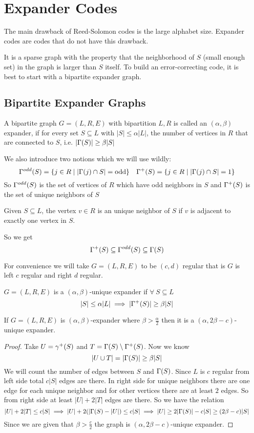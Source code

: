 \chapter{Expander Codes}
The main drawback of Reed-Solomon codes is the large alphabet size. Expander codes are codes that do not have this drawback.

It is a sparse graph with the property that the neighborhood of $S$ (small enough set) in the graph is larger than $S$ itself. To build an error-correcting code, it is best to start with a bipartite expander graph.
\section{Bipartite Expander Graphs}
\begin{definition}
	A bipartite graph $G=(L,R,E)$ with bipartition $L,R$ is called an $(\alpha,\beta)$ expander, if for every set $S\subseteq L$ with $|S|\leq \alpha|L|$, the number of vertices in $R$ that are connected to $S$, i.e. $|\Gamma(S)|\geq \beta|S|$
\end{definition}
We also introduce two notions which we will use wildly:
$$\Gamma^{odd}(S)=\{j\in R\mid |\Gamma(j)\cap S|=\text{odd}\}\quad \Gamma^{+}(S)=\{j\in R\mid |\Gamma(j)\cap S|=1\}$$
So $\Gamma^{odd}(S)$ is the set of vertices of $R$ which have odd neighbors in $S$ and  $\Gamma^{+}(S)$ is the set of unique neighbors of $S$
\begin{definition}
	Given $S\subseteq L$, the vertex $v\in R$ is  an unique neighbor of $S$ if $v$ is adjacent to exactly one vertex in $S$.
\end{definition}So we get $$\Gamma^+(S)\subseteq \Gamma^{odd}(S)\subseteq \Gamma(S)$$
\begin{remark}
	For convenience we will take $G=(L,R,E)$ to be $(c,d)$ regular that is $G$ is left $c$ regular and right $d$ regular.
\end{remark}
\begin{definition}
	$G=(L,R,E)$ is a $(\alpha,\beta)$-unique expander if $\forall\ S\subseteq L$ $$|S|\leq \alpha |L|\implies |\Gamma^+(S)|\geq \beta |S|$$
\end{definition}
\begin{theorem}\label{uniqevertexexpander}
	If $G=(L,R,E)$ is $(\alpha,\beta)$-expander where $\beta>\frac{\alpha}{2}$ then it is a $(\alpha,2\beta -c)$-unique expander.
\end{theorem}
\begin{proof}
	Take $U=\gamma^+(S)$ and $T=\Gamma(S)\setminus \Gamma^+(S)$. Now we know $$|U\cup T|=|\Gamma(S)|\geq \beta |S|$$ We will count the number of edges between $S$ and $\Gamma(S)$. Since $L$ is $c$ regular from left side total $c|S|$ edges are there. In right side for unique neighbors there are one edge for each unique neighbor and for other vertices there are at least $2$ edges.  So from right side at least $|U|+2|T|$ edges are there. So we have the relation $$|U|+2|T|\leq c|S|\implies |U|+2(|\Gamma(S)-|U|)\leq c|S|\implies |U|\geq 2|\Gamma(S)|-c|S|\geq (2\beta-c)|S|$$Since we are given that $\beta>\frac{c}2$ the graph is $(\alpha,2\beta-c)$-unique expander.
\end{proof}
